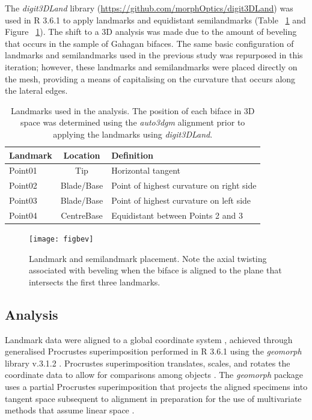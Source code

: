 \documentclass[review]{elsarticle}
\begin{document}
The \textit{digit3DLand} library (\href{https://github.com/morphOptics/digit3DLand}{https://github.com/morphOptics/digit3DLand}) was used in R 3.6.1 \citep{R} to apply landmarks and equidistant semilandmarks (Table ~\ref{tab:Tbl1} and Figure ~\ref{fig:fig5}). The shift to a 3D analysis was made due to the amount of beveling that occurs in the sample of Gahagan bifaces. The same basic configuration of landmarks and semilandmarks used in the previous study \citep[Figure 3]{RN11783} was repurposed in this iteration; however, these landmarks and semilandmarks were placed directly on the mesh, providing a means of capitalising on the curvature that occurs along the lateral edges.

\begin{table}[tbh]\centering
\footnotesize
\caption{Landmarks used in the analysis. The position of each biface in 3D space was determined using the \textit{auto3dgm} alignment prior to applying the landmarks using \textit{digit3DLand}.}
\centering
\begin{tabular}{lcp{7.5cm}}
\toprule
Landmark & Location & Definition\\
\midrule
Point01 & Tip & Horizontal tangent\\
Point02 & Blade/Base & Point of highest curvature on right side\\
Point03 & Blade/Base & Point of highest curvature on left side\\
Point04 & CentreBase & Equidistant between Points 2 and 3\\
\bottomrule
\end{tabular}
\label{tab:Tbl1}
\end{table}

\begin{figure}[ht]\centering
\texttt{[image: figbev]}
\caption{Landmark and semilandmark placement. Note the axial twisting associated with beveling when the biface is aligned to the plane that intersects the first three landmarks.}
\label{fig:fig5}
\end{figure}

\subsection*{Analysis}

Landmark data were aligned to a global coordinate system \citep{RN11622,RN11623,RN11563}, achieved through generalised Procrustes superimposition \citep{RN478} performed in R 3.6.1 \citep{R} using the \textit{geomorph} library v.3.1.2 \citep{RN11530,RN1774}. Procrustes superimposition translates, scales, and rotates the coordinate data to allow for comparisons among objects \citep{RN11564,RN478}. The \textit{geomorph} package uses a partial Procrustes superimposition that projects the aligned specimens into tangent space subsequent to alignment in preparation for the use of multivariate methods that assume linear space \citep{RN1646,RN11563}.
\end{document}
